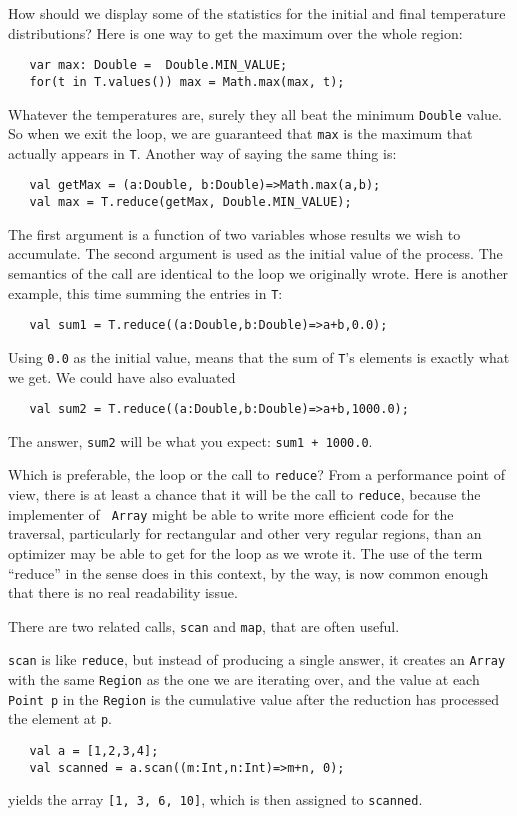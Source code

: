 How should we display some of the statistics for the initial and final
temperature distributions?  Here is one way to get the maximum over the
whole region:
\begin{verbatim}
   var max: Double =  Double.MIN_VALUE;
   for(t in T.values()) max = Math.max(max, t);
\end{verbatim}
Whatever the temperatures are, surely they all beat the minimum {\tt Double}
value.   So when we exit the loop, we are guaranteed that {\tt max}
is the maximum that actually appears in {\tt T}.
Another way of saying the same thing is:
\begin{verbatim}
   val getMax = (a:Double, b:Double)=>Math.max(a,b);
   val max = T.reduce(getMax, Double.MIN_VALUE);
\end{verbatim}
The first argument is a function of two variables whose results we wish to
accumulate.  
The second argument is used as the initial value of the process.  The semantics
of the call are identical to the loop we originally wrote. Here is another example,
this time summing the entries in {\tt T}:
\begin{verbatim}
   val sum1 = T.reduce((a:Double,b:Double)=>a+b,0.0);
\end{verbatim}
Using {\tt 0.0} as the
initial value, means that the sum of {\tt T}'s elements is exactly what we get.
We could have also evaluated
\begin{verbatim}
   val sum2 = T.reduce((a:Double,b:Double)=>a+b,1000.0);
\end{verbatim}
The answer, {\tt sum2} will be what you expect: {\tt sum1 + 1000.0}.

Which is preferable, the loop or the call to {\tt reduce}?  From a performance
point of view, there is at least a chance that it will be the call to {\tt reduce},
because the implementer of {\tt
Array} might be able to write more efficient code for the traversal, particularly for
rectangular and other very regular regions, than an optimizer may be
able to get for the loop as we wrote it.  The use of the term ``reduce'' in
the sense \Xten{} does in this context, by the way, is now common enough
that there is no real readability issue.

There are two related calls, {\tt scan} and {\tt map}, that are often useful.
 
{\tt scan} is like {\tt reduce}, but instead of producing a single answer, it
creates an {\tt Array} with the same {\tt Region} as the one we are iterating
over, and the value at each {\tt Point p} in the {\tt Region} is the cumulative
value after the reduction has processed the element at {\tt p}.
\begin{verbatim}
   val a = [1,2,3,4];
   val scanned = a.scan((m:Int,n:Int)=>m+n, 0);
\end{verbatim}
yields the array {\tt [1, 3, 6, 10]}, which is then assigned to {\tt scanned}.


